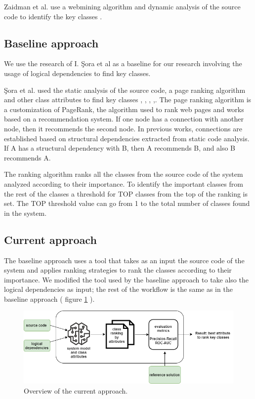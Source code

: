 \documentclass[runningheads]{comsis2}
\begin{document}
Zaidman et al. use a webmining algorithm and dynamic analysis of the source code to identify the key classes \cite{ZaidmanJurnal}.

\subsection{Baseline approach}
We use the research of I. Şora et al \cite{Finding-key-classes} as a baseline for our research involving the usage of logical dependencies to find key classes. 

Şora et al. used the static analysis of the source code, a page ranking algorithm and other class attributes to find key classes \cite{PagerankENASE}, \cite{enase15}, \cite{SoraSpringer}, \cite{PagerankSACI},\cite{Finding-key-classes}.
The page ranking algorithm is a customization of PageRank, the algorithm used to rank web pages \cite{ilprints422} and works based on a recommendation system. If one node has a connection with another node, then it recommends the second node. In previous works, connections are established based on structural dependencies extracted from static code analysis. If A has a structural dependency with B, then A recommends B, and also B recommends A.

The ranking algorithm ranks all the classes from the source code of the system analyzed according to their importance. To identify the important classes from the rest of the classes a threshold for TOP classes from the top of the ranking is set. The TOP threshold value can go from 1 to the total number of classes found in the system. 



\subsection{Current approach}

The baseline approach uses a tool that takes as an input the source code of the system and applies ranking strategies to rank the classes according to their importance. We modified the tool used by the baseline approach to take also the logical dependencies as input; the rest of the workflow is the same as in the baseline approach ( figure \ref{fig:baseline_approach} ).

\begin{figure}
\centering
\includegraphics[width=\textwidth]{current_approach.PNG}
\caption{Overview of the current approach.}
\label{fig:baseline_approach}
\centering
\end{figure}
\end{document}
